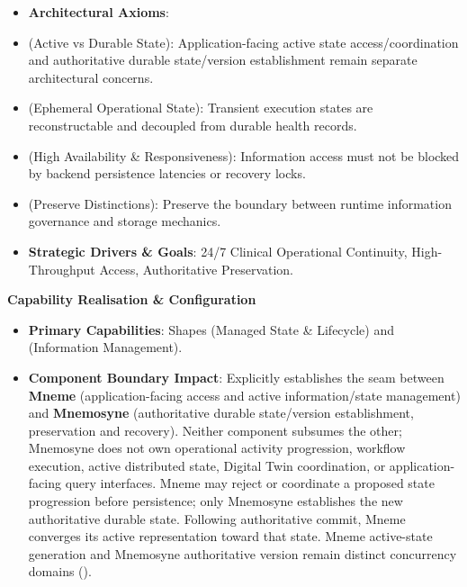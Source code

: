 \begin{itemize}


\item \textbf{Architectural Axioms}:

\item \texttt{} (Active vs Durable State): Application-facing active state access/coordination and authoritative durable state/version establishment remain separate architectural concerns.

\item \texttt{} (Ephemeral Operational State): Transient execution states are reconstructable and decoupled from durable health records.

\item \texttt{} (High Availability \& Responsiveness): Information access must not be blocked by backend persistence latencies or recovery locks.

\item \texttt{} (Preserve Distinctions): Preserve the boundary between runtime information governance and storage mechanics.

\item \textbf{Strategic Drivers \& Goals}: 24/7 Clinical Operational Continuity, High-Throughput Access, Authoritative Preservation.

\end{itemize}


\par\medskip\textbf{Capability Realisation \& Configuration}\par


\begin{itemize}


\item \textbf{Primary Capabilities}: Shapes \texttt{} (Managed State \& Lifecycle) and \texttt{} (Information Management).

\item \textbf{Component Boundary Impact}: Explicitly establishes the seam between \textbf{Mneme} (application-facing access and active information/state management) and \textbf{Mnemosyne} (authoritative durable state/version establishment, preservation and recovery). Neither component subsumes the other; Mnemosyne does not own operational activity progression, workflow execution, active distributed state, Digital Twin coordination, or application-facing query interfaces. Mneme may reject or coordinate a proposed state progression before persistence; only Mnemosyne establishes the new authoritative durable state. Following authoritative commit, Mneme converges its active representation toward that state. Mneme active-state generation and Mnemosyne authoritative version remain distinct concurrency domains (\texttt{}).

\end{itemize}


